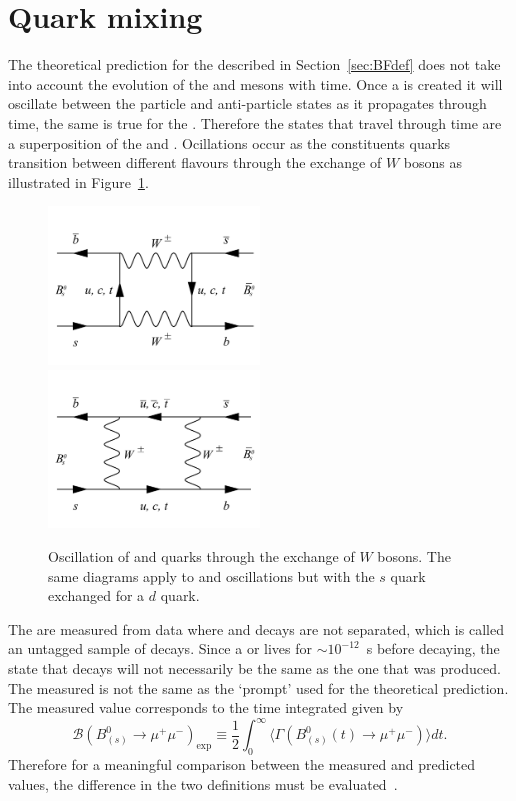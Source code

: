 {\section{Quark mixing}
\label{sec:quarkmaixing}
The theoretical prediction for the \bmumu \BFs described in Section~\ref{sec:BFdef} does not take into account the evolution of the \bsd and \barbsd mesons with time. Once a \bsd is created it will oscillate between the particle and anti-particle states as it propagates through time, the same is true for the \barbsd. Therefore the states that travel through time are a superposition of the \bsd and \barbsd. Ocillations occur as the constituents quarks transition between different flavours through the exchange of $W$ bosons as illustrated in Figure~\ref{fig:Oscl_diag}.
\begin{figure}[tbp]
    \centering
        \includegraphics[width=0.5\textwidth]{./Figs/Theory/Oscillation_1.pdf}
        \includegraphics[width=0.5\textwidth]{./Figs/Theory/Oscillation_2.pdf}
    \caption{Oscillation of \bs and \barbs quarks through the exchange of $W$ bosons. The same diagrams apply to \bd and \barbd oscillations but with the $s$ quark exchanged for a $d$ quark.}
    \label{fig:Oscl_diag}
\end{figure}
The \BFs are measured from data where \bsd and \barbsd decays are not separated, which is called an untagged sample of \bmumu decays. Since a \bsd or \barbsd lives for $\sim10^{-12}$~s before decaying, the state that decays will not necessarily be the same as the one that was produced. The measured \BF is not the same as the `prompt' \BF used for the theoretical prediction. The measured value corresponds to the time integrated \BF given by~\cite{DeBruyn:2012wj}
\begin{equation}
  \mathcal{B}(B^0_{(s)} \to \mu^+ \mu^-)_{\mathrm{exp}} \equiv \frac{1}{2} \int^{\infty}_0 \langle \Gamma(B^0_{(s)}(t) \to \mu^+\mu^-) \rangle dt.
\label{eq:time_BF}
\end{equation}
Therefore for a meaningful comparison between the measured and predicted \BF values, the difference in the two definitions must be evaluated~\cite{DeBruyn:2012wj,DeBruyn:2012wk,Buras:2013uqa}. %

}
